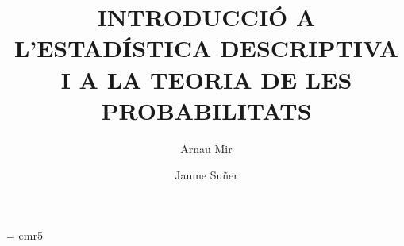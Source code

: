 \documentclass[11pt,a4paper]{book}
\makeatletter
\newcounter{problema}
\renewcommand\tableofcontents{%
    \if@twocolumn
      \@restonecoltrue\onecolumn
    \else
      \@restonecolfalse
    \fi
    \chapter*{\contentsname
        \@mkboth{%
           \contentsname}{\contentsname}}%
    \@starttoc{toc}%
    \if@restonecol\twocolumn\fi
    }
\renewcommand\listoffigures{%
    \if@twocolumn
      \@restonecoltrue\onecolumn
    \else
      \@restonecolfalse
    \fi
    \chapter*{\listfigurename
      \@mkboth{\listfigurename}%
              {\listfigurename}}%
    \@starttoc{lof}%
    \if@restonecol\twocolumn\fi
    }
\makeatother
\begin{document}
\font\fiverm = cmr5



\newcommand{\bblref}[1]{{\bf \ref{#1}}}
\newtheorem{proposition}{Proposici\'o}[chapter]
\newtheorem{defin}{Definici\'o}[chapter]
\setcounter{problema}{0}
\setcounter{cas}{0}
\newcommand{\e}{{\rm e}}
\newcommand{\EE}{{\rm E}}
\newcommand{\Var}{{\rm Var}}
\newcommand{\Cov}{{\rm Cov}}
\newcommand{\pp}[1]{p\left\{#1\right\}}
\renewcommand{\thecas}{\Roman{cas}}
\newcommand{\posacas}{\addtocounter{cas}{1}{\bf \thecas}}



\makeatletter
{}
\makeatother
\makeatletter
\newcommand\etiqueta[1]{\immediate\write\@auxout{\string
      \newlabel{#1}{{\thechapter .\theproblema}}}}
\makeatother
\newcommand{\text}[1]{\mbox{#1}}


\newenvironment{prob}
{\addtocounter{problema}{1}
\noindent
{\textbf{\thechapter.\theproblema.- }}}
{
\vspace{\baselineskip}}

\newlength\amplada
\setlength{\amplada}{\textwidth - 8mm}
\newenvironment{probres}[1]
{\addtocounter{problema}{1}
\noindent
\shadowbox
{
\parbox{\amplada}{
\noindent
{\textbf{\thechapter.\theproblema.- }}#1}}}
{
\vspace{\baselineskip}}

\newcommand{\prb}[1]{\addtocounter{problema}{1}
\noindent
{\textbf{\thechapter.\theproblema.- }#1}
\vspace{\baselineskip}
}
\newcommand{\prbr}[1]{\addtocounter{problema}{1}
\noindent\shadowbox{
\parbox{\textwidth}{
\noindent
{\textbf{\thechapter.\theproblema.- }#1}
}}
\vspace{\baselineskip}
}

\newcommand{\res}[1]{
\textbf{Resoluci\'o. }{\sf #1}
\vspace{\baselineskip}
}
\title{INTRODUCCI\'O A L'ESTAD\'ISTICA DESCRIPTIVA I A LA TEORIA DE LES
PROBABILITATS
}
\author{Arnau Mir\and
Jaume Su\~ner}
\maketitle







\nocite{*}


\printindex
\end{document}
